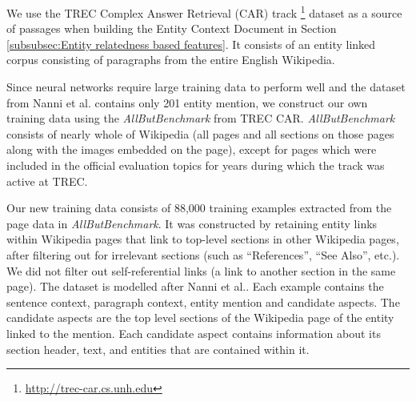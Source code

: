 We use the TREC Complex Answer Retrieval (CAR) track \cite{dietz2018trec}\footnote{\url{http://trec-car.cs.unh.edu}} dataset as a source of passages when building the Entity Context Document in Section \ref{subsubsec:Entity relatedness based features}. It consists of an entity linked corpus consisting of paragraphs from the entire English Wikipedia. 

Since neural networks require large training data to perform well and the dataset from Nanni et al. \cite{nanni2018entity} contains only 201 entity mention, we construct our own training data using the \textit{AllButBenchmark} from TREC CAR. \textit{AllButBenchmark} consists of nearly whole of Wikipedia (all pages and all sections on those pages along with the images embedded on the page), except for pages which were included in the official evaluation topics for years during which the track was active at TREC.

Our new training data consists of 88,000 training examples extracted from the page data in \textit{AllButBenchmark}. It was constructed by retaining entity links within Wikipedia pages that link to top-level sections in other Wikipedia pages, after filtering out for irrelevant sections (such as ``References'', ``See Also'', etc.). We did not filter out self-referential links (a link to another section in the same page). The dataset is modelled after Nanni et al.\cite{nanni2018entity}. Each example contains the sentence context, paragraph context, entity mention and candidate aspects. The candidate aspects are the top level sections of the Wikipedia page of the entity linked to the mention. Each candidate aspect contains information about its section header, text, and entities that are contained within it.


    
    


